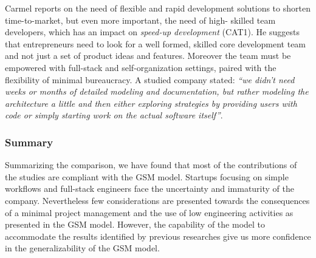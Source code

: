 \documentclass[10pt,journal,letterpaper,compsoc]{IEEEtran}
\begin{document}
Carmel \cite{Camel1994a} reports on the need of flexible and rapid development
solutions to shorten time-to-market, but even more important, the need of  high-
skilled team developers, which has an impact on \textit{speed-up  development}
(CAT1). He suggests that entrepreneurs need to look for a well  formed, skilled
core development team and not just a set of product ideas and  features.
Moreover the team must be empowered with full-stack and  self-organization
settings, paired with the flexibility of minimal bureaucracy.  A studied company
stated: \textit{``we didn't need weeks or months of detailed  modeling and
documentation, but rather modeling the architecture a little and  then either
exploring strategies by providing users with code or simply starting  work on
the actual software itself''}.



\subsubsection{Summary} Summarizing the comparison, we have found that most of
the  contributions of the studies are compliant with the GSM model. Startups
focusing on simple workflows and full-stack engineers face the uncertainty and
immaturity of the company. Nevertheless few considerations are presented towards
the consequences of a minimal project management and the use of low engineering
activities as presented in the GSM model. However, the capability of the model
to accommodate the results identified by previous researches give us more
confidence in the generalizability of the GSM model.
\end{document}

